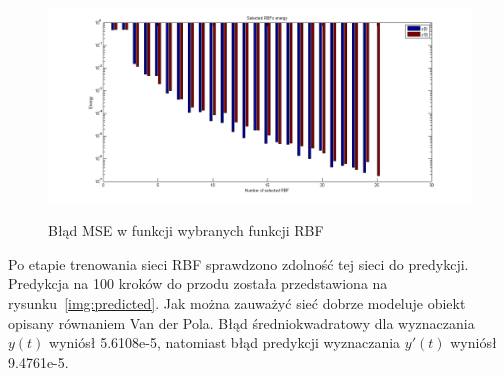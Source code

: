 \begin{figure}[ht!]
	\centering

	{\includegraphics[width=1.1\textwidth]
	{images/rbfs_energy.png}}

	\caption{Błąd MSE w funkcji wybranych funkcji RBF}
	\label{img:energy}
\end{figure}

Po etapie trenowania sieci RBF sprawdzono zdolność tej sieci do predykcji. Predykcja na 100 kroków do przodu została przedstawiona na rysunku~\ref{img:predicted}. Jak można zauważyć sieć dobrze modeluje obiekt opisany równaniem Van der Pola. Błąd średniokwadratowy dla wyznaczania $y(t)$ wyniósł  5.6108e-5, natomiast błąd predykcji wyznaczania $y'(t)$ wyniósł 9.4761e-5.

